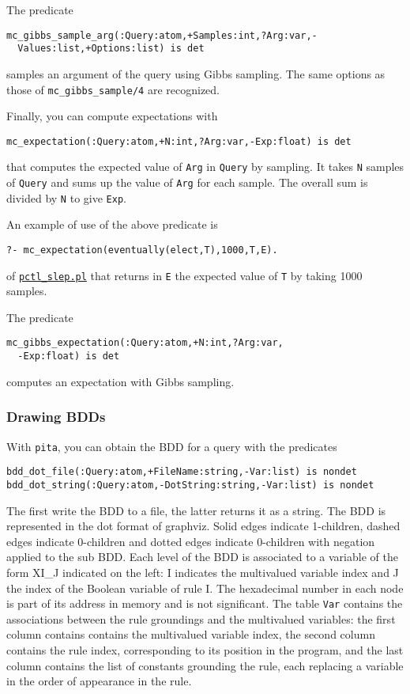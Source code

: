 The predicate
\begin{verbatim}
mc_gibbs_sample_arg(:Query:atom,+Samples:int,?Arg:var,-
  Values:list,+Options:list) is det
\end{verbatim}
samples an argument of the query using Gibbs sampling. The same options as those of \verb|mc_gibbs_sample/4| are
recognized.

Finally, you can compute expectations with
\begin{verbatim}
mc_expectation(:Query:atom,+N:int,?Arg:var,-Exp:float) is det
\end{verbatim}
that computes the expected value of \verb|Arg| in \verb|Query| by
sampling.
It takes \verb|N| samples of \verb|Query| and sums up the value of \verb|Arg| for
each sample. The overall sum is divided by \verb|N| to give \verb|Exp|.

An example of use of the above predicate is
\begin{verbatim}
?- mc_expectation(eventually(elect,T),1000,T,E).
\end{verbatim}
of \href{http://cplint.eu/example/inference/pctl_slep.pl}{\texttt{pctl\_slep.pl}}
that returns in \verb|E| the expected value of \verb|T| by taking 1000 samples.

The predicate
\begin{verbatim}
mc_gibbs_expectation(:Query:atom,+N:int,?Arg:var,
  -Exp:float) is det
\end{verbatim}
computes an expectation with Gibbs sampling.

\subsubsection{Drawing BDDs}

With \verb|pita|, you can obtain the BDD for a query with the predicates
\begin{verbatim}
bdd_dot_file(:Query:atom,+FileName:string,-Var:list) is nondet
bdd_dot_string(:Query:atom,-DotString:string,-Var:list) is nondet
\end{verbatim}
The first write the BDD to a file, the latter returns it as a string.
The BDD is represented in the dot format of graphviz.
Solid edges indicate 1-children, dashed edges indicate 0-children and dotted
edges indicate 0-children with negation applied to the sub BDD.
Each level of the BDD is associated to a variable of the form XI\_J indicated on the left:
I indicates the multivalued variable index and J the index of the Boolean variable of rule I.
The hexadecimal number in each node is part of its address in memory and is not significant.
The table \verb|Var| contains the associations between the rule groundings and the
multivalued variables: the first column contains contains the multivalued variable index,
the second column contains the rule index, corresponding
to its position in the program, and the last column contains the list
of constants grounding the rule, each replacing a variable in the order of appearance in the
rule.

